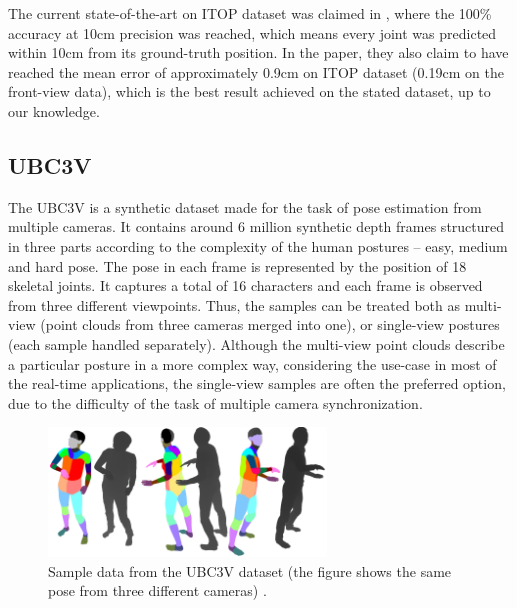 \noindent
The current state-of-the-art on ITOP dataset was claimed in \cite{Marin18jvcir}, where the 100\% accuracy at 10cm precision was reached, which means every joint was predicted within 10cm from its ground-truth position. In the paper, they also claim to have reached the mean error of approximately 0.9cm on ITOP dataset (0.19cm on the front-view data), which is the best result achieved on the stated dataset, up to our knowledge.

\subsection{UBC3V}

The UBC3V \cite{Shafaei16} is a synthetic dataset made for the task of pose estimation from multiple cameras. It contains around 6 million synthetic depth frames structured in three parts according to the complexity of the human postures – easy, medium and hard pose. The pose in each frame is represented by the position of 18 skeletal joints. It captures a total of 16 characters and each frame is observed from three different viewpoints. Thus, the samples can be treated both as multi-view (point clouds from three cameras merged into one), or single-view postures (each sample handled separately). Although the multi-view point clouds describe a particular posture in a more complex way, considering the use-case in most of the real-time applications, the single-view samples are often the preferred option, due to the difficulty of the task of multiple camera synchronization.\par

\vspace{5mm}
\begin{figure}[H]
\begin{center}
  \includegraphics[height=130px]{images/implementation/ubc3v.png}
  \caption[Sample data from the UBC3V dataset \cite{Shafaei16}.]{Sample data from the UBC3V dataset (the figure shows the same pose from three different cameras) \cite{Shafaei16}.}
  \label{fig:ubc3v}
\end{center}
\end{figure}

